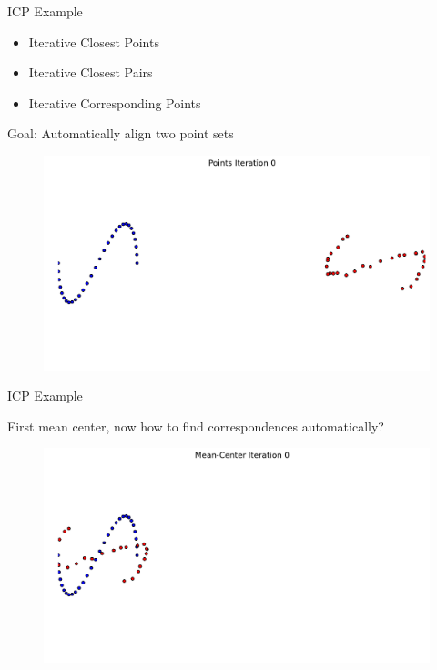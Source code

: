 \documentclass{beamer}
\begin{document}
\begin{frame}{ICP Example}

\begin{itemize}[label=$\vartriangleright$]
\item Iterative Closest Points
\item Iterative Closest Pairs
\item Iterative Corresponding Points
\end{itemize}

Goal: Automatically align two point sets

\begin{figure}[t]
\centering
    \includegraphics[width=\textwidth]{ICPExample/ICP0_1.pdf}%
\end{figure}


\end{frame}


\begin{frame}{ICP Example}

First mean center, now how to find correspondences automatically?

\begin{figure}[t]
\centering
    \includegraphics[width=\textwidth]{ICPExample/ICP0_2.pdf}%
\end{figure}


\end{frame}
\end{document}
